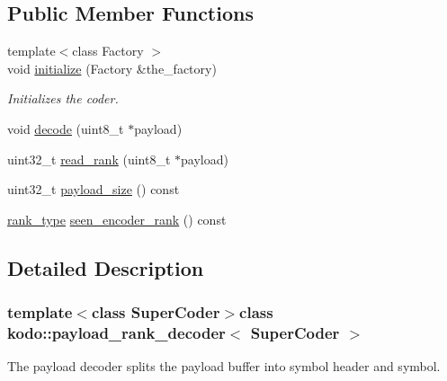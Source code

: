 \subsection*{Public Member Functions}
\begin{DoxyCompactItemize}
\item 
{\footnotesize template$<$class Factory $>$ }\\void \hyperlink{classkodo_1_1payload__rank__decoder_a6da38b5b49824b757acd991f38839d9d}{initialize} (Factory \&the\-\_\-factory)
\begin{DoxyCompactList}\small\item\em Initializes the coder. \end{DoxyCompactList}\item 
void \hyperlink{classkodo_1_1payload__rank__decoder_a3404ab5f4e4620240bb206830386ebfc}{decode} (uint8\-\_\-t $\ast$payload)
\begin{DoxyCompactList}\small\item\em \end{DoxyCompactList}\item 
uint32\-\_\-t \hyperlink{classkodo_1_1payload__rank__decoder_a43f77b6db25225d0757966b84f4c3439}{read\-\_\-rank} (uint8\-\_\-t $\ast$payload)
\item 
uint32\-\_\-t \hyperlink{classkodo_1_1payload__rank__decoder_a19be986538635db47975da5987122401}{payload\-\_\-size} () const 
\begin{DoxyCompactList}\small\item\em \end{DoxyCompactList}\item 
\hyperlink{classkodo_1_1payload__rank__decoder_acd7741c3a43c976696a0b63d9a35bf60}{rank\-\_\-type} \hyperlink{classkodo_1_1payload__rank__decoder_af8b0b06e2b30430f5590b4455b1f4296}{seen\-\_\-encoder\-\_\-rank} () const 
\end{DoxyCompactItemize}


\subsection{Detailed Description}
\subsubsection*{template$<$class Super\-Coder$>$class kodo\-::payload\-\_\-rank\-\_\-decoder$<$ Super\-Coder $>$}

The payload decoder splits the payload buffer into symbol header and symbol. 


